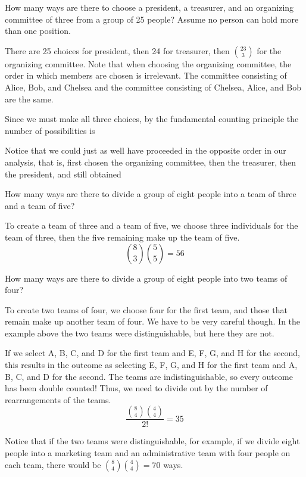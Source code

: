 \begin{examp}
How many ways are there to choose a president, a treasurer, and an organizing committee of three from a group of 25 people? Assume no person can hold more than one position.
\par
\noindent There are 25 choices for president, then 24 for treasurer, then $\binom{23}{3}$ for the organizing committee. Note that when choosing the organizing committee, the order in which members are chosen is irrelevant. The committee consisting of Alice, Bob, and Chelsea and the committee consisting of Chelsea, Alice, and Bob are the same.
\par
\noindent Since we must make all three choices, by the fundamental counting principle the number of possibilities is
\par
\noindent Notice that we could just as well have proceeded in the opposite order in our analysis, that is, first chosen the organizing committee, then the treasurer, then the president, and still obtained
\end{examp}
\begin{examp}How many ways are there to divide a group of eight people into a team of three and a team of five?
\par
\noindent To create a team of three and a team of five, we choose three individuals for the team of three, then the five remaining make up the team of five.
$$\binom{8}{3}\binom{5}{5} = 56$$
\end{examp}
\begin{examp}How many ways are there to divide a group of eight people into two teams of four?
\par
\noindent To create two teams of four, we choose four for the first team, and those that remain make up another team of four. We have to be very careful though. In the example above the two teams were distinguishable, but here they are not. 
\par
\noindent If we select A, B, C, and D for the first team and E, F, G, and H for the second, this results in the outcome as selecting E, F, G, and H for the first team and A, B, C, and D for the second. The teams are indistinguishable, so every outcome has been double counted! Thus, we need to divide out by the number of rearrangements of the teams.
$$\frac{\binom{8}{4}\binom{4}{4}}{2!} = 35$$
\par
\noindent Notice that if the two teams were distinguishable, for example, if we divide eight people into a marketing team and an administrative team with four people on each team, there would be $\binom{8}{4}\binom{4}{4} = 70$ ways.
\end{examp}

